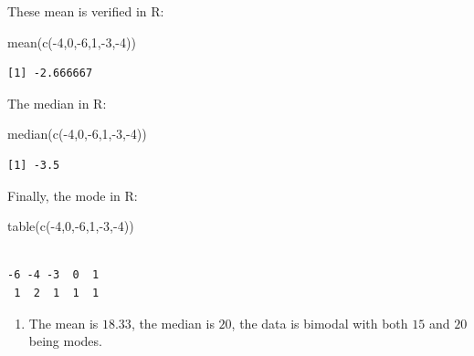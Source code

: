 \documentclass[
  letterpaper,
  DIV=11,
  numbers=noendperiod]{scrreprt}
\newenvironment{Shaded}{\begin{snugshade}}{\end{snugshade}}
\newcommand{\DecValTok}[1]{\textcolor[rgb]{0.68,0.00,0.00}{#1}}
\newcommand{\FunctionTok}[1]{\textcolor[rgb]{0.28,0.35,0.67}{#1}}
\newcommand{\NormalTok}[1]{\textcolor[rgb]{0.00,0.23,0.31}{#1}}
\newcommand{\SpecialCharTok}[1]{\textcolor[rgb]{0.37,0.37,0.37}{#1}}
\providecommand{\tightlist}{%
  \setlength{\itemsep}{0pt}\setlength{\parskip}{0pt}}\usepackage{longtable,booktabs,array}
\begin{document}
These mean is verified in R:

\begin{Shaded}
\begin{Highlighting}[numbers=left,,]
\FunctionTok{mean}\NormalTok{(}\FunctionTok{c}\NormalTok{(}\SpecialCharTok{{-}}\DecValTok{4}\NormalTok{,}\DecValTok{0}\NormalTok{,}\SpecialCharTok{{-}}\DecValTok{6}\NormalTok{,}\DecValTok{1}\NormalTok{,}\SpecialCharTok{{-}}\DecValTok{3}\NormalTok{,}\SpecialCharTok{{-}}\DecValTok{4}\NormalTok{))}
\end{Highlighting}
\end{Shaded}

\begin{verbatim}
[1] -2.666667
\end{verbatim}

The median in R:

\begin{Shaded}
\begin{Highlighting}[numbers=left,,]
\FunctionTok{median}\NormalTok{(}\FunctionTok{c}\NormalTok{(}\SpecialCharTok{{-}}\DecValTok{4}\NormalTok{,}\DecValTok{0}\NormalTok{,}\SpecialCharTok{{-}}\DecValTok{6}\NormalTok{,}\DecValTok{1}\NormalTok{,}\SpecialCharTok{{-}}\DecValTok{3}\NormalTok{,}\SpecialCharTok{{-}}\DecValTok{4}\NormalTok{))}
\end{Highlighting}
\end{Shaded}

\begin{verbatim}
[1] -3.5
\end{verbatim}

Finally, the mode in R:

\begin{Shaded}
\begin{Highlighting}[numbers=left,,]
\FunctionTok{table}\NormalTok{(}\FunctionTok{c}\NormalTok{(}\SpecialCharTok{{-}}\DecValTok{4}\NormalTok{,}\DecValTok{0}\NormalTok{,}\SpecialCharTok{{-}}\DecValTok{6}\NormalTok{,}\DecValTok{1}\NormalTok{,}\SpecialCharTok{{-}}\DecValTok{3}\NormalTok{,}\SpecialCharTok{{-}}\DecValTok{4}\NormalTok{))}
\end{Highlighting}
\end{Shaded}

\begin{verbatim}

-6 -4 -3  0  1 
 1  2  1  1  1 
\end{verbatim}

\begin{enumerate}
\def\labelenumi{\arabic{enumi}.}
\setcounter{enumi}{2}
\tightlist
\item
  The mean is \(18.33\), the median is \(20\), the data is bimodal with
  both \(15\) and \(20\) being modes.
\end{enumerate}
\end{document}
